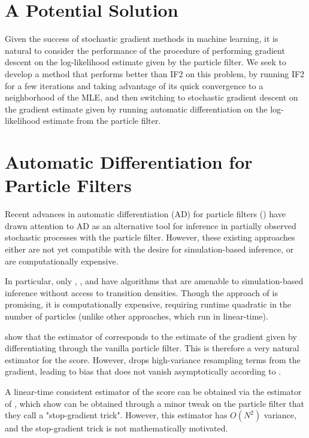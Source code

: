 \documentclass{article}
\begin{document}
\section{A Potential Solution}

Given the success of stochastic gradient methods in machine learning, it is natural to consider the performance of the procedure of performing gradient descent on the log-likelihood estimate given by the particle filter. We seek to develop a method that performs better than IF2 on this problem, by running IF2 for a few iterations and taking advantage of its quick convergence to a neighborhood of the MLE, and then switching to stochastic gradient descent on the gradient estimate given by running automatic differentiation on the log-likelihood estimate from the particle filter. 



\section{Automatic Differentiation for Particle Filters}

Recent advances in automatic differentiation (AD) for particle filters (\cite{blei2018vsmc, jon2018diffpf, corenflos21, scibior2021dpf, doucet2022particlebased}) have drawn attention to AD as an alternative tool for inference in partially observed stochastic processes with the particle filter. However, these existing approaches either are not yet compatible with the desire for simulation-based inference, or are computationally expensive. 

In particular, only \cite{scibior21}, \cite{blei2018vsmc}, and \cite{corenflos21} have algorithms that are amenable to simulation-based inference without access to transition densities. Though the approach of \citet{corenflos21} is promising, it is computationally expensive, requiring runtime quadratic in the number of particles (unlike other approaches, which run in linear-time). 

\cite{scibior21} show that the estimator of \cite{blei2018vsmc} corresponds to the estimate of the gradient given by differentiating through the vanilla particle filter. This is therefore a very natural estimator for the score. However, \citet{blei2018vsmc} drops high-variance resampling terms from the gradient, leading to bias that does not vanish asymptotically according to \citet{corenflos21}.

A linear-time consistent estimator of the score can be obtained via the estimator of \cite{poyiadjis11}, which \cite{scibior21} show can be obtained through a minor tweak on the particle filter that they call a "stop-gradient trick". However, this estimator has $O(N^2)$ variance, and the stop-gradient trick is not mathematically motivated. 
\end{document}
